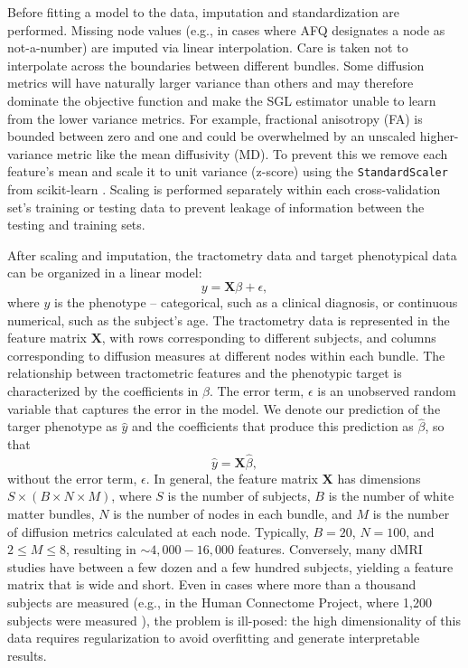 Before fitting a model to the data, imputation and standardization are
performed. Missing node values (e.g., in cases where AFQ designates a node as
not-a-number) are imputed via linear interpolation. Care is taken not to
interpolate across the boundaries between different bundles. Some diffusion
metrics will have naturally larger variance than others and may therefore
dominate the objective function and make the SGL estimator unable to learn from
the lower variance metrics. For example, fractional anisotropy (FA) is bounded
between zero and one and could be overwhelmed by an unscaled higher-variance
metric like the mean diffusivity (MD). To prevent this we remove each feature's
mean and scale it to unit variance (z-score) using the
\lstinline{StandardScaler} from scikit-learn \cite{scikit-learn}. Scaling is
performed separately within each cross-validation set's training or testing data
to prevent leakage of information between the testing and training
sets\cite{kaufman2012leakage}.

After scaling and imputation, the tractometry data and target
phenotypical data can be organized in a linear model:
\begin{equation}
    y = \mathbf{X} \beta + \epsilon,
    \label{eq:lm}
\end{equation}
where $y$ is the phenotype -- categorical, such as a clinical diagnosis,
or continuous numerical, such as the subject's age. The tractometry
data is represented in the feature matrix $\mathbf{X}$, with rows
corresponding to different subjects, and columns corresponding
to diffusion measures at different nodes within each bundle. The
relationship between tractometric features and the phenotypic target is
characterized by the coefficients in $\beta$. The error term, $\epsilon$
is an unobserved random variable that captures the error in the model.
We denote our prediction of the targer phenotype as $\hat{y}$ and the
coefficients that produce this prediction as $\hat{\beta}$, so that
\begin{equation}
    \hat{y} = \mathbf{X} \hat{\beta},
    \label{eq:lm-approx}
\end{equation}
without the error term, $\epsilon$. In general, the feature matrix
$\mathbf{X}$ has dimensions $S \times (B \times N \times M)$, where $S$
is the number of subjects, $B$ is the number of white matter bundles,
$N$ is the number of nodes in each bundle, and $M$ is the number of
diffusion metrics calculated at each node. Typically, $B = 20$, $N =
100$, and $2 \le M \le 8$, resulting in $\sim 4,000 - 16,000$ features.
Conversely, many dMRI studies have between a few dozen and a few
hundred subjects, yielding a feature matrix that is wide and short.
Even in cases where more than a thousand subjects are measured (e.g.,
in the Human Connectome Project, where 1,200 subjects were measured
\cite{VanEssen2012}), the problem is ill-posed: the high dimensionality
of this data requires regularization to avoid overfitting and generate
interpretable results.

